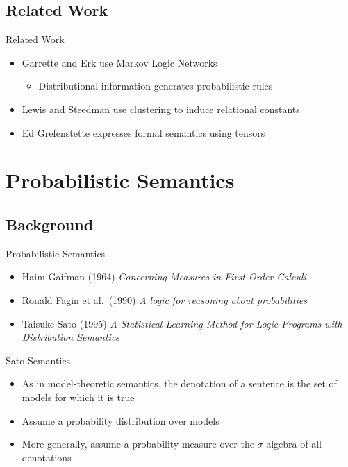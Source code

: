 \documentclass{beamer}
\newlength{\wideitemsep}
\let\olditem\item
\renewcommand{\item}{\setlength{\itemsep}{\wideitemsep}\olditem}
\begin{document}
\subsection{Related Work}

\begin{frame}{Related Work}
\begin{itemize}
\item Garrette and Erk use Markov Logic Networks
\begin{itemize}
\item Distributional information generates probabilistic rules
\end{itemize}
\item Lewis and Steedman use clustering to induce relational constants
\item Ed Grefenstette expresses formal semantics using tensors
\end{itemize}
\end{frame}

\section{Probabilistic Semantics}

\subsection{Background}

\begin{frame}{Probabilistic Semantics}
\begin{itemize}
\item Haim Gaifman (1964) \textit{Concerning Measures in First Order Calculi}
\item Ronald Fagin et al.~(1990) \textit{A logic for reasoning about probabilities}
\item Taisuke Sato (1995) \textit{A Statistical Learning Method for Logic Programs with Distribution Semantics}
\end{itemize}
\end{frame}

\begin{frame}{Sato Semantics}
\begin{itemize}
\item As in model-theoretic semantics, the denotation of a sentence is
  the set of models for which it is true
\item Assume a probability distribution over models
\item More generally, assume a probability measure over the $\sigma$-algebra of all denotations
\end{itemize}
\end{frame}
\end{document}
